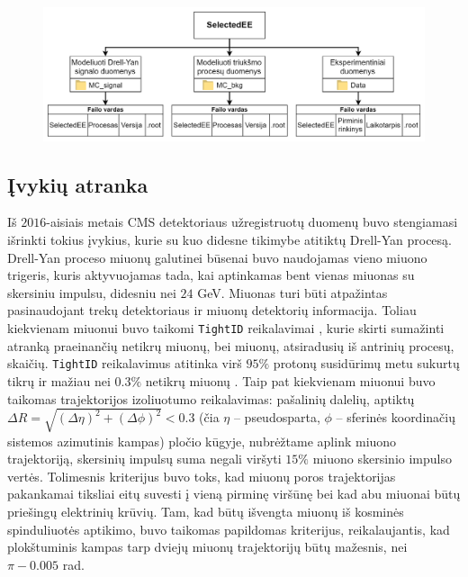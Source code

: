 \documentclass[a4paper, 12pt, twoside]{article}
\newcommand{\ttt}[1]{\texttt{#1}}
\newlength\q
\begin{document}
\begin{figure}
	\includegraphics[width=\textwidth]{atrinktu_duomenu_schema_v1.png}
\end{figure}

\subsection{Įvykių atranka}\label{sec:selection}
Iš $2016$-aisiais metais CMS detektoriaus užregistruotų duomenų buvo stengiamasi išrinkti tokius įvykius, kurie
su kuo didesne tikimybe atitiktų Drell-Yan procesą.
Drell-Yan proceso miuonų galutinei būsenai buvo naudojamas vieno miuono trigeris, kuris aktyvuojamas tada,
kai aptinkamas bent vienas miuonas su skersiniu impulsu, didesniu nei $24$ GeV.
Miuonas turi būti atpažintas pasinaudojant trekų detektoriaus ir miuonų detektorių informacija.
Toliau kiekvienam miuonui buvo taikomi \ttt{TightID} reikalavimai \cite{MuonID}, kurie skirti sumažinti atranką
praeinančių netikrų miuonų, bei miuonų, atsiradusių iš antrinių procesų, skaičių.
\ttt{TightID} reikalavimus atitinka virš $95\%$ protonų susidūrimų metu sukurtų tikrų ir mažiau nei $0.3\%$ netikrų
miuonų \cite{MuonID}.
Taip pat kiekvienam miuonui buvo taikomas trajektorijos izoliuotumo reikalavimas: pašalinių dalelių, aptiktų
$\Delta R = \sqrt{(\Delta\eta)^2 + (\Delta\phi)^2} < 0.3$ (čia $\eta$ -- pseudosparta, $\phi$ -- sferinės koordinačių
sistemos azimutinis kampas) pločio kūgyje, nubrėžtame aplink miuono trajektoriją, skersinių impulsų suma negali
viršyti $15\%$ miuono skersinio impulso vertės.
Tolimesnis kriterijus buvo toks, kad miuonų poros trajektorijas pakankamai tiksliai eitų suvesti į vieną pirminę
viršūnę bei kad abu miuonai būtų priešingų elektrinių krūvių.
Tam, kad būtų išvengta miuonų iš kosminės spinduliuotės aptikimo, buvo taikomas papildomas kriterijus, reikalaujantis,
kad plokštuminis kampas tarp dviejų miuonų trajektorijų būtų mažesnis, nei $\pi-0.005$ rad.
\end{document}
